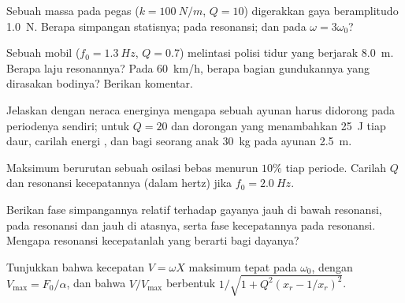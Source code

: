 \begin{exercise}[$\star$]\label{exo:b1:oscillators-resonance:4}
Sebuah massa pada pegas ($k = \qty{100}{N/m}$, $Q = 10$) digerakkan gaya
beramplitudo \qty{1.0}{N}. Berapa simpangan statisnya;  pada
resonansi; dan  pada $\omega = 3\omega_0$?
\end{exercise}

\begin{exercise}[$\star\star$]\label{exo:b1:oscillators-resonance:5}
Sebuah mobil ($f_0 = \qty{1.3}{Hz}$, $Q = 0.7$) melintasi polisi tidur
yang berjarak \qty{8.0}{m}. Berapa laju resonannya? Pada \qty{60}{km/h},
berapa bagian  gundukannya yang dirasakan bodinya? Berikan komentar.
\end{exercise}

\begin{exercise}[$\star\star$]\label{exo:b1:oscillators-resonance:6}
Jelaskan dengan neraca energinya mengapa sebuah ayunan harus didorong
pada periodenya sendiri; untuk $Q = 20$ dan dorongan yang menambahkan
\qty{25}{J} tiap daur, carilah energi , dan 
bagi seorang anak \qty{30}{kg} pada ayunan \qty{2.5}{m}.
\end{exercise}

\begin{exercise}[$\star\star$]\label{exo:b1:oscillators-resonance:7}
Maksimum berurutan sebuah osilasi bebas menurun $10\%$ tiap periode.
Carilah $Q$ dan  resonansi kecepatannya (dalam hertz) jika
$f_0 = \qty{2.0}{Hz}$.
\end{exercise}

\begin{exercise}[$\star\star$]\label{exo:b1:oscillators-resonance:8}
Berikan fase simpangannya relatif terhadap gayanya jauh di bawah
resonansi, pada resonansi dan jauh di atasnya, serta fase kecepatannya
pada resonansi. Mengapa resonansi kecepatanlah yang berarti bagi dayanya?
\end{exercise}

\begin{exercise}[$\star\star$]\label{exo:b1:oscillators-resonance:9}
Tunjukkan bahwa  kecepatan $V = \omega X$ maksimum tepat pada
$\omega_0$, dengan $V_{\max} = F_0/\alpha$, dan bahwa $V/V_{\max}$
berbentuk $1/\sqrt{1 + Q^2(x_r - 1/x_r)^2}$.
\end{exercise}


